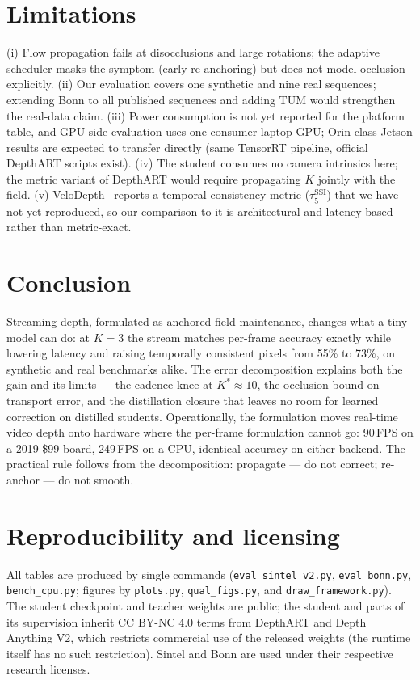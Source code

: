 \documentclass[10pt,twocolumn]{article}
\begin{document}
\section{Limitations}
\label{sec:limits}
(i) Flow propagation fails at disocclusions and large rotations; the adaptive
scheduler masks the symptom (early re-anchoring) but does not model
occlusion explicitly. (ii) Our evaluation covers one synthetic and nine real
sequences; extending Bonn to all published sequences and adding TUM would
strengthen the real-data claim. (iii) Power consumption is not yet reported
for the platform table, and GPU-side evaluation uses one consumer laptop GPU;
Orin-class Jetson results are expected to transfer directly (same TensorRT
pipeline, official DepthART scripts exist). (iv) The student consumes no
camera intrinsics here; the metric variant of DepthART would require
propagating $K$ jointly with the field. (v) VeloDepth~\cite{velodepth}
reports a temporal-consistency metric ($\tau^{\mathrm{SSI}}_5$) that we have
not yet reproduced, so our comparison to it is architectural and
latency-based rather than metric-exact.

\section{Conclusion}
Streaming depth, formulated as anchored-field maintenance, changes what
a tiny model can do: at $K{=}3$ the stream matches per-frame accuracy
exactly while lowering latency and raising temporally consistent pixels
from 55\% to 73\%, on synthetic and real benchmarks alike. The error
decomposition explains both the gain and its limits --- the cadence knee at
$K^*{\approx}10$, the occlusion bound on transport error, and the
distillation closure that leaves no room for learned correction on
distilled students. Operationally, the formulation moves real-time video
depth onto hardware where the per-frame formulation cannot go: 90\,FPS on
a 2019 \$99 board, 249\,FPS on a CPU, identical accuracy on either
backend. The practical rule follows from the decomposition: propagate ---
do not correct; re-anchor --- do not smooth.

\section*{Reproducibility and licensing}
All tables are produced by single commands
(\texttt{eval\_sintel\_v2.py}, \texttt{eval\_bonn.py}, \texttt{bench\_cpu.py};
figures by \texttt{plots.py}, \texttt{qual\_figs.py}, and
\texttt{draw\_framework.py}). The student checkpoint and teacher weights are
public; the student and parts of its supervision inherit CC BY-NC 4.0 terms
from DepthART and Depth Anything V2, which restricts commercial use of the
released weights (the runtime itself has no such restriction). Sintel and
Bonn are used under their respective research licenses.
\end{document}
